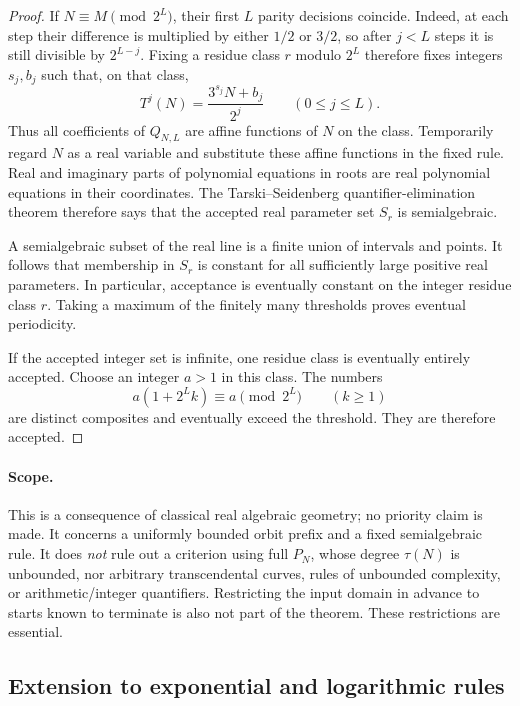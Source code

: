 \documentclass[11pt,a4paper]{article}
\theoremstyle{definition}
\theoremstyle{remark}
\numberwithin{equation}{section}
\begin{document}
\begin{proof}
If $N\equiv M\pmod {2^L}$, their first $L$ parity decisions coincide.
Indeed, at each step their difference is multiplied by either $1/2$ or
$3/2$, so after $j<L$ steps it is still divisible by $2^{L-j}$.
Fixing a residue class $r$ modulo $2^L$ therefore fixes integers $s_j,b_j$
such that, on that class,
\[
 T^j(N)=\frac{3^{s_j}N+b_j}{2^j}\qquad(0\leq j\leq L).
\]
Thus all coefficients of $Q_{N,L}$ are affine functions of $N$ on the class.
Temporarily regard $N$ as a real variable and substitute these affine
functions in the fixed rule.  Real and imaginary parts of polynomial
equations in roots are real polynomial equations in their coordinates.
The Tarski--Seidenberg quantifier-elimination theorem \cite{R065}
therefore says that
the accepted real parameter set $S_r$ is semialgebraic.

A semialgebraic subset of the real line is a finite union of intervals and
points.  It follows that membership in $S_r$ is constant for all sufficiently
large positive real parameters.  In particular, acceptance is eventually
constant on the integer residue class $r$.  Taking a maximum of the finitely
many thresholds proves eventual periodicity.

If the accepted integer set is infinite, one residue class is eventually
entirely accepted.  Choose an integer $a>1$ in this class.  The numbers
\[
 a(1+2^Lk)\equiv a\pmod {2^L}\qquad(k\geq1)
\]
are distinct composites and eventually exceed the threshold.  They are
therefore accepted.
\end{proof}

\paragraph{Scope.}
This is a consequence of classical real algebraic geometry; no priority
claim is made.  It concerns a uniformly bounded orbit prefix and a fixed
semialgebraic rule.  It does \emph{not} rule out a criterion using full
$P_N$, whose degree $\tau(N)$ is unbounded, nor arbitrary transcendental
curves, rules of unbounded complexity, or arithmetic/integer quantifiers.
Restricting the input domain in advance to starts known to terminate is
also not part of the theorem.  These restrictions are essential.


\subsection{Extension to exponential and logarithmic rules}
\label{C:sec:ominimal-prefix-extension}
\end{document}
